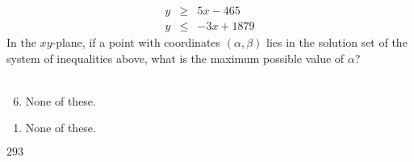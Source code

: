  
\begin{eqnarray*}
y&\geq&5x-465 \\
y&\leq&-3x+1879 
\end{eqnarray*}
In the $xy$-plane, if a point with coordinates $(\alpha,\beta)$ lies in the solution set of the system of inequalities above, what is the maximum possible value of $\alpha$?\\\\


\ifsat
	\begin{enumerate}[label=\Alph*)]
	\end{enumerate}
\else
\fi

\ifacteven
	\begin{enumerate}[label=\textbf{\Alph*.},itemsep=\fill,align=left]
		\setcounter{enumii}{5}
		\item None of these. 
	\end{enumerate}
\else
\fi

\ifactodd
	\begin{enumerate}[label=\textbf{\Alph*.},itemsep=\fill,align=left]
		\item None of these. 
	\end{enumerate}
\else
\fi

\ifgridin
$293$
\else
\fi

